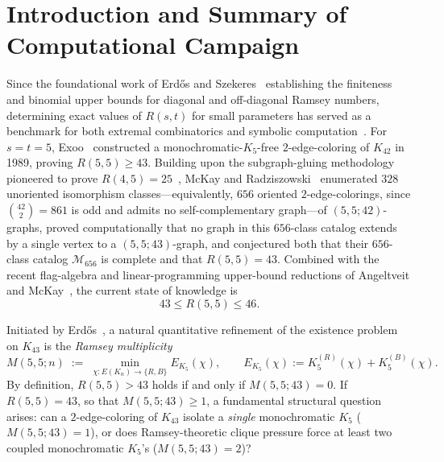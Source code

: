 \documentclass[11pt,a4paper]{article}
\theoremstyle{plain}
\theoremstyle{definition}
\begin{document}
\begin{abstract}
\medskip
\noindent\textbf{2020 Mathematics Subject Classification:} Primary \texttt{05C55} (Generalized Ramsey theory), \texttt{05D10} (Ramsey theory); Secondary \texttt{68V15} (Theorem proving), \texttt{68R10} (Graph theory in computer science).

\smallskip
\noindent\textbf{Keywords:} Ramsey number $R(5,5)$; Ramsey multiplicity $M(5,5;43)$; $(5,5;42)$-graphs; bit-parallel branch-and-bound; hypergraph coloring; computer-assisted proof; Lean~4 formal verification.
\end{abstract}

\tableofcontents

\section{Introduction and Summary of Computational Campaign}
\label{sec:intro}

Since the foundational work of Erd\H{o}s and Szekeres~\cite{ErdosSzekeres1935} establishing the finiteness and binomial upper bounds for diagonal and off-diagonal Ramsey numbers, determining exact values of $R(s,t)$ for small parameters has served as a benchmark for both extremal combinatorics and symbolic computation~\cite{RadziszowskiSurvey}. For $s = t = 5$, Exoo~\cite{Exoo1989} constructed a monochromatic-$K_5$-free $2$-edge-coloring of $K_{42}$ in 1989, proving $R(5,5) \ge 43$. Building upon the subgraph-gluing methodology pioneered to prove $R(4,5) = 25$~\cite{McKayRadziszowski1995}, McKay and Radziszowski~\cite{McKayRadziszowski1997} enumerated $328$ unoriented isomorphism classes---equivalently, $656$ oriented $2$-edge-colorings, since $\binom{42}{2} = 861$ is odd and admits no self-complementary graph---of $(5,5;42)$-graphs, proved computationally that no graph in this $656$-class catalog extends by a single vertex to a $(5,5;43)$-graph, and conjectured both that their $656$-class catalog $\mathcal{M}_{656}$ is complete and that $R(5,5) = 43$. Combined with the recent flag-algebra and linear-programming upper-bound reductions of Angeltveit and McKay~\cite{AngeltveitMcKay2018,AngeltveitMcKay2024}, the current state of knowledge is
\[
  43 \le R(5,5) \le 46.
\]

Initiated by Erd\H{o}s~\cite{Erdos1962Multiplicity}, a natural quantitative refinement of the existence problem on $K_{43}$ is the \emph{Ramsey multiplicity}
\begin{equation}\label{eq:multiplicity-def}
  M(5,5; n) \;:=\; \min_{\chi : E(K_n) \to \{R, B\}} E_{K_5}(\chi),
  \qquad E_{K_5}(\chi) := K_5^{(R)}(\chi) + K_5^{(B)}(\chi).
\end{equation}
By definition, $R(5,5) > 43$ holds if and only if $M(5,5;43) = 0$. If $R(5,5) = 43$, so that $M(5,5;43) \ge 1$, a fundamental structural question arises: can a $2$-edge-coloring of $K_{43}$ isolate a \emph{single} monochromatic $K_5$ ($M(5,5;43) = 1$), or does Ramsey-theoretic clique pressure force at least two coupled monochromatic $K_5$'s ($M(5,5;43) = 2$)?
\end{document}
